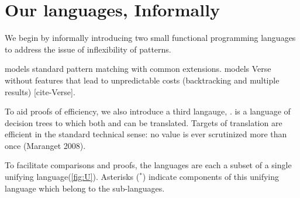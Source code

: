 \documentclass[manuscript,screen,review, 12pt]{acmart}
\begin{document}


\section{Our languages, Informally}

We begin by informally introducing two small functional programming languages to
address the issue of inflexibility of patterns.

{\PPlus} models standard pattern matching with common extensions. {\VMinus}
models Verse without features that lead to unpredictable costs (backtracking and
multiple results) [cite-Verse]. 

To aid proofs of efficiency, we also introduce a third langauge, {\D}. {\D} is a
language of decision trees to which both {\PPlus} and {\VMinus} can be
translated. Targets of translation are efficient in the standard technical
sense: no value is ever scrutinized more than once (Maranget 2008).

To facilitate comparisons and proofs, the languages are each a subset of a
single unifying language(\cref{fig:U}). Asterisks (${}^{*}$) indicate components
of this unifying language which belong to the sub-languages. 
\end{document}
